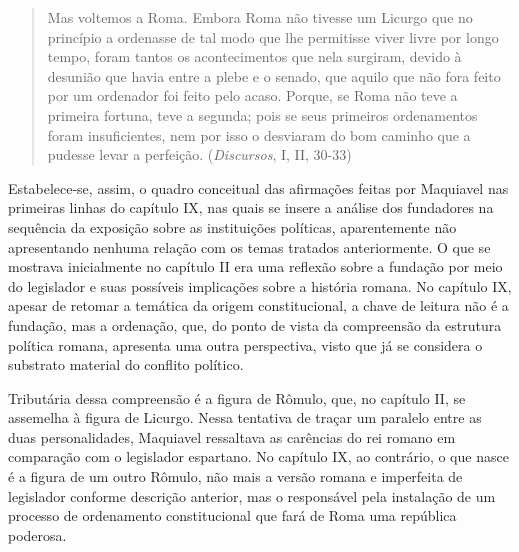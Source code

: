 \begin{quote}
Mas voltemos a Roma. Embora Roma não tivesse um Licurgo que no princípio
a ordenasse de tal modo que lhe permitisse viver livre por longo tempo,
foram tantos os acontecimentos que nela surgiram, devido à desunião que
havia entre a plebe e o senado, que aquilo que não fora feito por um
ordenador foi feito pelo acaso. Porque, se Roma não teve a primeira
fortuna, teve a segunda; pois se seus primeiros ordenamentos foram
insuficientes, nem por isso o desviaram do bom caminho que a pudesse
levar a perfeição. (\emph{Discursos}, I, II, 30-33)
\end{quote}

Estabelece-se, assim, o quadro conceitual das afirmações feitas por
Maquiavel nas primeiras linhas do capítulo IX, nas quais se insere a
análise dos fundadores na sequência da exposição sobre as instituições
políticas, aparentemente não apresentando nenhuma relação com os temas
tratados anteriormente. O que se mostrava inicialmente no capítulo II
era uma reflexão sobre a fundação por meio do legislador e suas
possíveis implicações sobre a história romana. No capítulo IX, apesar de
retomar a temática da origem constitucional, a chave de leitura não é a
fundação, mas a ordenação, que, do ponto de vista da compreensão da
estrutura política romana, apresenta uma outra perspectiva, visto que já
se considera o substrato material do conflito político.

Tributária dessa compreensão é a figura de Rômulo, que, no capítulo II,
se assemelha à figura de Licurgo. Nessa tentativa de traçar um paralelo
entre as duas personalidades, Maquiavel ressaltava as carências do rei
romano em comparação com o legislador espartano. No capítulo IX, ao
contrário, o que nasce é a figura de um outro Rômulo, não mais a versão
romana e imperfeita de legislador conforme descrição anterior, mas o
responsável pela instalação de um processo de ordenamento constitucional
que fará de Roma uma república poderosa.

